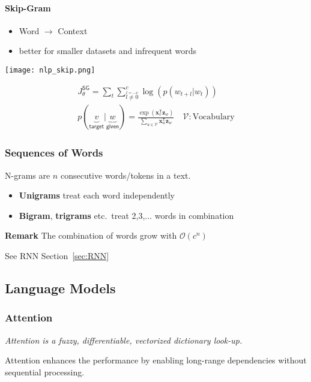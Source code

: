 \paragraph{Skip-Gram}
\begin{itemize}
    \item Word $\to$ Context
    \item better for smaller datasets and infrequent words
\end{itemize}

\begin{center}
    \texttt{[image: nlp\_skip.png]}
\end{center}
\noindent\begin{gather*}
    J_{\theta}^{\mathsf{SG}} = \sum_{t}\sum_{\overset{l=-c}{l\neq 0}}^{c} \log(p(w_{t+l}|w_t))\\
    p(\underbrace{v}_{\textsf{target}} | \underbrace{w}_{\textsf{given}})  = \frac{\exp(\mathbf{x}_v^{\mathsf{T}}\mathbf{z}_w)}{\sum\limits_{u\in \mathcal{V}} \mathbf{x}_u^{\mathsf{T}}\mathbf{z}_w} \quad \mathcal{V}: \text{Vocabulary}
\end{gather*}

\subsubsection{Sequences of Words}
N-grams are $n$ consecutive words/tokens in a text.
\begin{itemize}
    \item \textbf{Unigrams} treat each word independently
    \item \textbf{Bigram}, \textbf{trigrams} etc.\ treat 2,3,$\ldots$ words in combination
\end{itemize}
\textbf{Remark} The combination of words grow with $\mathcal{O}(c^n)$

\newpar{}
See RNN Section~\ref{sec:RNN}

\subsection{Language Models}
\subsubsection{Attention}
\textit{Attention is a fuzzy, differentiable, vectorized dictionary look-up.}

\newpar{}
Attention enhances the performance by enabling long-range dependencies without sequential processing.

